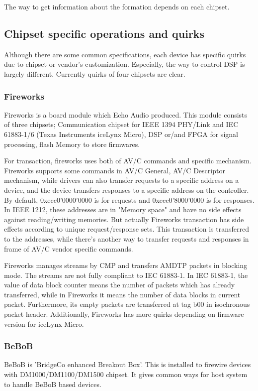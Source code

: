 \documentclass[onecolumn]{article}
\begin{document}
The way to get information about the formation depends on each chipset.

\subsection{Chipset specific operations and quirks}

Although there are some common specifications, each device has specific quirks due to chipset or vendor's customization. Especially, the way to control DSP is largely different. Currently quirks of four chipsets are clear.

\subsubsection{Fireworks}
Fireworks is a board module which Echo Audio produced. This module consists of three chipsets; Communication chipset for IEEE 1394 PHY/Link and IEC 61883-1/6 (Texas Instruments iceLynx Micro), DSP or/and FPGA for signal processing, flash Memory to store firmwares.

For transaction, fireworks uses both of AV/C commands and specific mechanism. Fireworks supports some commands in AV/C General\cite{avc-general-4-2}, AV/C Descriptor mechanism\cite{avc-general-enhancement}, while drivers can also transfer requests to a specific address on a device, and the device transfers responses to a specific address on the controller. By default, 0xecc0'0000'0000 is for requests and 0xecc0'8000'0000 is for responses. In IEEE 1212, these addresses are in "Memory space" and have no side effects against reading/writing memories. But actually Fireworks transaction has side effects according to unique request/response sets. This transaction is transferred to the addresses, while there's another way to transfer requests and responses in frame of AV/C vendor specific commands.

Fireworks manages streams by CMP and transfers AMDTP packets in blocking mode. The streams are not fully compliant to IEC 61883-1. In IEC 61883-1, the value of data block counter means the number of packets which has already transferred, while in Fireworks it means the number of data blocks in current packet. Furthermore, its empty packets are transferred at tag b00 in isochronous packet header. Additionally, Fireworks has more quirks depending on firmware version for iceLynx Micro.


\subsubsection{BeBoB}
BeBoB is 'BridgeCo enhanced Breakout Box'. This is installed to firewire devices with DM1000/DM1100/DM1500 chipset. It gives common ways for host system to handle BeBoB based devices.
\end{document}
